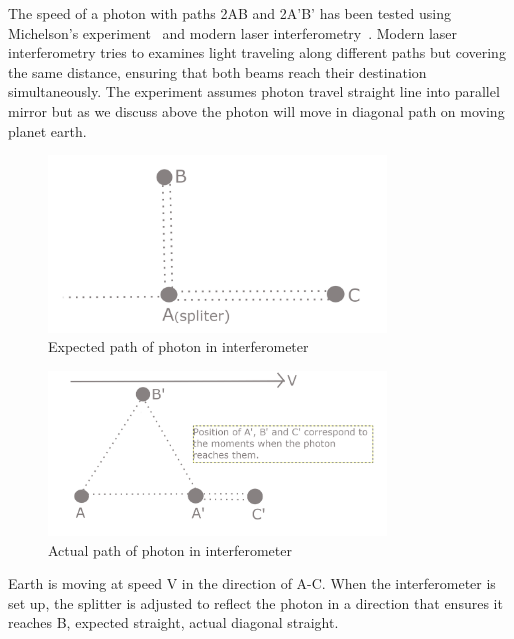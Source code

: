 \documentclass{article}
\begin{document}
    The speed of a photon with paths 2AB and 2A’B’ has been tested using Michelson’s experiment~\cite{michelson1879velocity} and modern laser interferometry~\cite{evans1972measurement}.
    Modern laser interferometry tries to examines light traveling along different paths but covering the same distance, ensuring that both beams reach their destination simultaneously.
    The experiment assumes photon travel straight line into parallel mirror but  as we discuss above the photon will move in diagonal path on moving planet earth.

    \begin{figure}[H]
        \centering
        \includegraphics[width=0.8\textwidth]{images/interferometry_expected_photon_phath}
        \caption{Expected path of photon in interferometer}
        \label{fig:interferometry_expected_photon_phath}
    \end{figure}



    \begin{figure}[H]
        \centering
        \includegraphics[width=0.8\textwidth]{images/interferometry_actual_photon_phath}
        \caption{Actual path of photon in interferometer}
        \label{fig:interferometry_actual_photon_phath}
    \end{figure}

    Earth is moving at speed V in the direction of A-C. When the interferometer is set up, the splitter is adjusted to reflect the photon in a direction that ensures it reaches B, expected straight, actual diagonal straight.
\end{document}
